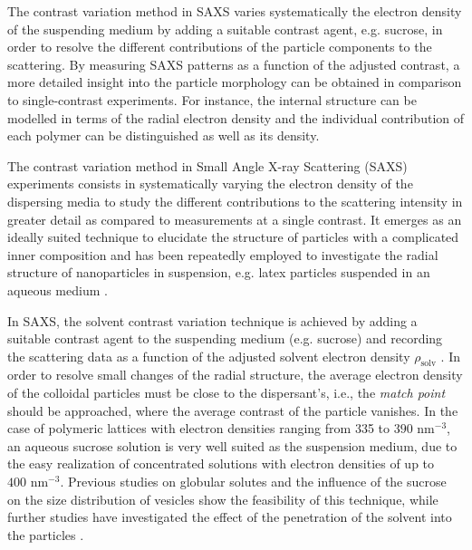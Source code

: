 The contrast variation method in SAXS varies systematically the electron density of the suspending medium by adding a suitable contrast agent, e.g. sucrose, in order to resolve the different contributions of the particle components to the scattering. By measuring SAXS patterns as a function of the adjusted contrast, a more detailed insight into the particle morphology can be obtained in comparison to single-contrast experiments\citep{bolze_situ_2004}. For instance, the internal structure can be modelled in terms of the radial electron density\citep{dingenouts_radial_1994,dingenouts_analysis_1999,ballauff_analysis_2011,ballauff_small-angle_1996} and the individual contribution of each polymer can be distinguished\citep{beyer_saxs_1990,grunder_analysis_1991,grunder_small-angle_1993,ottewill_characterization_1995,bolze_small-angle_1997,dingenouts_structure_1994} as well as its density\citep{mykhaylyk_application_2007}.


The contrast variation method in Small Angle X-ray Scattering (SAXS) experiments consists in systematically varying the electron density of the dispersing media to study the different contributions to the scattering intensity in greater detail as compared to measurements at a single contrast. It emerges as an ideally suited technique to elucidate the structure of particles with a complicated inner composition and has been repeatedly employed to investigate the radial structure of nanoparticles in suspension, e.g. latex particles suspended in an aqueous medium \citep{dingenouts_analysis_1999,ballauff_analysis_2011}. 

In SAXS, the solvent contrast variation technique is achieved by adding a suitable contrast agent to the suspending medium (e.g. sucrose) and recording the scattering data as a function of the adjusted solvent electron density \( \rho_{\text{solv}} \) \citep{ballauff_saxs_2001-1,bolze_application_2003}. In order to resolve small changes of the radial structure, the average electron density of the colloidal particles must be close to the dispersant's, i.e., the \emph{match point} should be approached, where the average contrast of the particle vanishes. In the case of polymeric lattices with electron densities ranging from 335 to \(390 \mbox{ nm}^{-3}\), an aqueous sucrose solution is very well suited as the suspension medium, due to the easy realization of concentrated solutions with electron densities of up to \(400 \mbox{ nm}^{-3}\). Previous studies on globular solutes \citep{kawaguchi_isoscattering_1992} and the influence of the sucrose on the size distribution of vesicles \citep{kiselev_sucrose_2001-1} show the feasibility of this technique, while further studies have investigated the effect of the penetration of the solvent into the particles \citep{kawaguchi_isoscattering_1993}.


